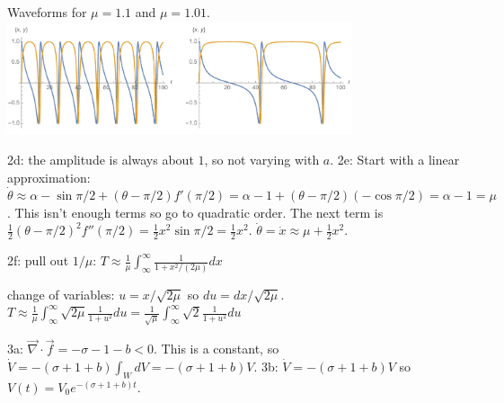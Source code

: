 \documentclass[12pt,letterpaper,noanswers]{exam}
\begin{document}
Waveforms for $\mu = 1.1$ and $\mu = 1.01$. \includegraphics[width=4in]{img/InfinitePeriod.pdf}

2d: the amplitude is always about $1$, so not varying with $a$.
2e: Start with a linear approximation: $\dot \theta \approx \alpha - \sin\pi/2 + (\theta - \pi/2)f'(\pi/2) = \alpha -1 + (\theta -\pi/2)(-\cos \pi/2) = \alpha -1 = \mu$.  This isn't enough terms so go to quadratic order.  The next term is $\frac{1}{2}(\theta - \pi/2)^2f''(\pi/2) = \frac{1}{2} x^2 \sin \pi/2 = \frac{1}{2}x^2$.  $\dot \theta = \dot x \approx \mu + \frac{1}{2}x^2.$

2f: pull out $1/\mu$: $\displaystyle T \approx \frac{1}{\mu}\int_{\infty}^\infty \frac{1}{1+x^2/(2\mu)}dx$

change of variables: $u = x/\sqrt{2\mu}$ so $du = dx/\sqrt{2\mu}$.  $\displaystyle T \approx \frac{1}{\mu} \int_{\infty}^\infty \sqrt{2\mu}\frac{1}{1+u^2}du = \frac{1}{\sqrt{\mu}}\int_{\infty}^\infty \sqrt{2}\frac{1}{1+u^2}du$


3a: $\vec\nabla \cdot \vec f = -\sigma -1 -b < 0$.  This is a constant, so $\dot V = -(\sigma + 1 + b)\int_W dV = -(\sigma + 1 + b)V$.  3b: $\dot V = -(\sigma + 1 + b)V$ so $V(t) = V_0 e^{-(\sigma+1+b)t}.$
\end{document}

